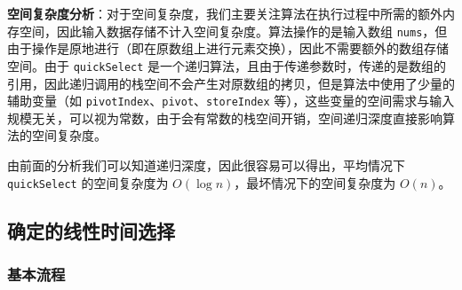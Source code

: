 \textbf{空间复杂度分析}：对于空间复杂度，我们主要关注算法在执行过程中所需的额外内存空间，因此输入数据存储不计入空间复杂度。算法操作的是输入数组 \texttt{nums}，但由于操作是原地进行（即在原数组上进行元素交换），因此不需要额外的数组存储空间。由于 \texttt{quickSelect} 是一个递归算法，且由于传递参数时，传递的是数组的引用，因此递归调用的栈空间不会产生对原数组的拷贝，但是算法中使用了少量的辅助变量（如 \texttt{pivotIndex}、\texttt{pivot}、\texttt{storeIndex} 等），这些变量的空间需求与输入规模无关，可以视为常数，由于会有常数的栈空间开销，空间递归深度直接影响算法的空间复杂度。

由前面的分析我们可以知道递归深度，因此很容易可以得出，平均情况下 \texttt{quickSelect} 的空间复杂度为 \( O(\log n) \)，最坏情况下的空间复杂度为 \( O(n) \)。

\subsection{确定的线性时间选择}

\subsubsection{基本流程}

